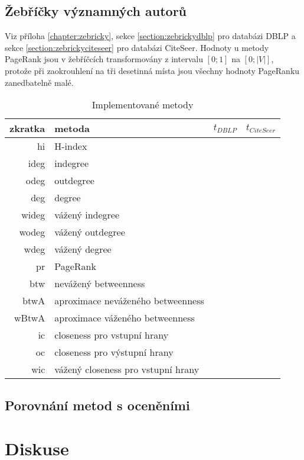 \documentclass[12pt,titlepage]{report}
\begin{document}
\clearpage
\section{Žebříčky významných autorů}
Viz příloha \ref{chapter:zebricky}, sekce \ref{section:zebrickydblp} pro
databázi DBLP a sekce \ref{section:zebrickyciteseer} pro databázi CiteSeer.
Hodnoty u metody PageRank jsou v žebříčcích transformovány z intervalu $[0; 1]$
na $[0; |V|]$, protože při zaokrouhlení na tři desetinná místa jsou všechny
hodnoty PageRanku zanedbatelně malé.
\begin{table}[!ht]
\begin{center}
\begin{tabular}{r|l|c|c}
\toprule
zkratka & metoda & $t_{DBLP}$ & $t_{CiteSeer}$ \\
\midrule
hi    & H-index                            \\
ideg  & indegree                           \\
odeg  & outdegree                          \\
deg   & degree                             \\
wideg & vážený indegree                    \\
wodeg & vážený outdegree                   \\
wdeg  & vážený degree                      \\
pr    & PageRank                           \\
btw   & nevážený betweenness               \\
btwA  & aproximace neváženého betweenness  \\
wBtwA & aproximace váženého betweenness    \\
ic    & closeness pro vstupní hrany        \\
oc    & closeness pro výstupní hrany       \\
wic   & vážený closeness pro vstupní hrany \\
\bottomrule
\end{tabular}
\end{center}
\caption{Implementované metody}
\label{tab:impmetody}
\end{table}


\section{Porovnání metod s oceněními}

\chapter{Diskuse}
\end{document}

